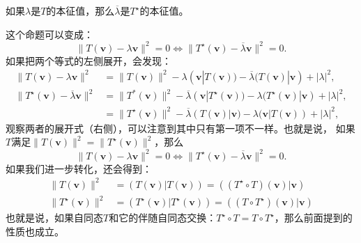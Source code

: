 \documentclass[12pt,UTF8]{ctexbook}
\begin{document}
如果$\lambda$是$T$的本征值，那么$\overline{\lambda}$是$T^\star$的本征值。

这个命题可以变成：
$$ \| T(\mathbf{v}) - \lambda \mathbf{v}\|^2 = 0 \Leftrightarrow \| T^\star(\mathbf{v}) - \overline{\lambda} \mathbf{v}\|^2 = 0.$$
如果把两个等式的左侧展开，会发现：
\begin{align*}
    \| T(\mathbf{v}) - \lambda \mathbf{v}\|^2 &= \| T(\mathbf{v})\|^2 - \lambda (\mathbf{v} | T(\mathbf{v})) - \overline{\lambda} (T(\mathbf{v}) | \mathbf{v}) + |\lambda|^2,  \\
    \| T^\star(\mathbf{v}) - \overline{\lambda} \mathbf{v}\|^2 &= \| T^*(\mathbf{v})\|^2 -  \overline{\lambda} (\mathbf{v} | T^\star(\mathbf{v})) - \lambda (T^\star(\mathbf{v}) | \mathbf{v}) + |\lambda|^2,  \\
    &= \| T^\star(\mathbf{v})\|^2 -  \overline{\lambda} (T(\mathbf{v}) | \mathbf{v}) - \lambda (\mathbf{v} | T(\mathbf{v})) + |\lambda|^2, 
\end{align*}
观察两者的展开式（右侧），可以注意到其中只有第一项不一样。也就是说，
如果$T$满足$\| T(\mathbf{v})\|^2 = \| T^\star(\mathbf{v})\|^2$，那么
$$ \| T(\mathbf{v}) - \lambda \mathbf{v}\|^2 = 0 \Leftrightarrow \| T^\star(\mathbf{v}) - \overline{\lambda} \mathbf{v}\|^2 = 0.$$
如果我们进一步转化，还会得到：
\begin{align*}
    \| T(\mathbf{v})\|^2 &= (T(\mathbf{v}) | T(\mathbf{v})) = ((T^\star\circ T)(\mathbf{v}) | \mathbf{v})  \\
    \| T^\star(\mathbf{v})\|^2 &= (T^\star(\mathbf{v}) | T^\star(\mathbf{v})) = ((T\circ T^\star)(\mathbf{v}) | \mathbf{v})  
\end{align*}
也就是说，如果自同态$T$和它的伴随自同态交换：$T^\star\circ T = T\circ T^\star$，那么前面提到的性质也成立。
\end{document}
